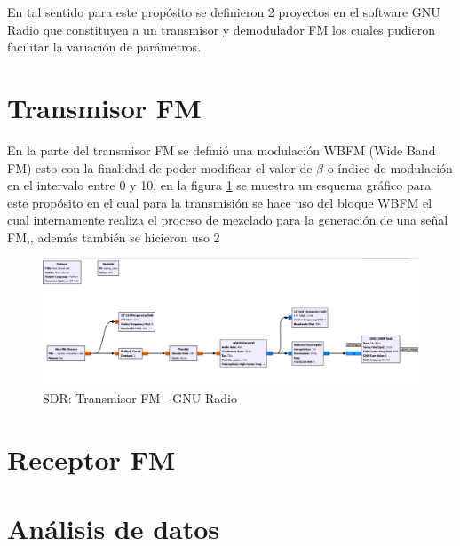 \documentclass[conference]{IEEEtran}
\begin{document}
	En tal sentido para este propósito se definieron 2 proyectos en el software GNU Radio que constituyen a un transmisor y demodulador FM los cuales pudieron facilitar la variación de parámetros.
	
	\section{ Transmisor FM }
	
	En la parte del transmisor FM se definió una modulación WBFM (Wide Band FM) esto con la finalidad de poder modificar el valor de $\beta$ o índice de modulación en el intervalo entre 0 y 10, en la figura \ref{fig:transmisor-fm} se muestra un esquema gráfico para este propósito en el cual para la transmisión se hace uso del bloque WBFM el cual internamente realiza el proceso de mezclado para la generación de una señal FM,, además también se hicieron uso  2
	
	
	\begin{figure}[h]
		\centering
		\includegraphics[width=0.5\linewidth]{media/transmisor-fm}
		\caption{SDR: Transmisor FM - GNU Radio}
		\label{fig:transmisor-fm}
	\end{figure}
	
	
	\section{ Receptor FM }
	
	\section{ Análisis de datos }
	
	
	
	
	
	
	
	
\end{document}
